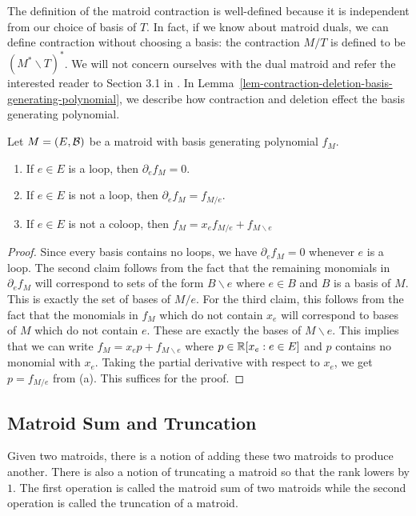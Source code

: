 \documentclass{puthesis-UG}
\begin{document}
The definition of the matroid contraction is well-defined because it is independent from our choice of basis of $T$. In fact, if we know about matroid duals, we can define contraction without choosing a basis: the contraction $M / T$ is defined to be $(M^* \backslash T)^*$. We will not concern ourselves with the dual matroid and refer the interested reader to Section 3.1 in \cite{10.5555/1197093}. In Lemma~\ref{lem-contraction-deletion-basis-generating-polynomial}, we describe how contraction and deletion effect the basis generating polynomial. 

\begin{lem} \label{lem-contraction-deletion-basis-generating-polynomial}
	Let $M = (E, \mathcal{B})$ be a matroid with basis generating polynomial $f_M$.
	\begin{enumerate}[label = (\alph*)]
		\item If $e \in E$ is a loop, then $\partial_e f_M = 0$. 
		\item If $e \in E$ is not a loop, then $\partial_e f_M = f_{M/e}$. 
		\item If $e \in E$ is not a coloop, then $f_M = x_e f_{M/e} + f_{M \backslash e}$
	\end{enumerate}
\end{lem}

\begin{proof}
	Since every basis contains no loops, we have $\partial_e f_M = 0$ whenever $e$ is a loop. The second claim follows from the fact that the remaining monomials in $\partial_e f_M$ will correspond to sets of the form $B \backslash e$ where $e \in B$ and $B$ is a basis of $M$. This is exactly the set of bases of $M / e$. For the third claim, this follows from the fact that the monomials in $f_M$ which do not contain $x_e$ will correspond to bases of $M$ which do not contain $e$. These are exactly the bases of $M \backslash e$. This implies that we can write $f_M = x_e p + f_{M \backslash e}$ where $p \in \mathbb{R}[x_e : e \in E]$ and $p$ contains no monomial with $x_e$. Taking the partial derivative with respect to $x_e$, we get $p = f_{M / e}$ from (a). This suffices for the proof. 
\end{proof}

\subsection{Matroid Sum and Truncation}

Given two matroids, there is a notion of adding these two matroids to produce another. There is also a notion of truncating a matroid so that the rank lowers by $1$. The first operation is called the matroid sum of two matroids while the second operation is called the truncation of a matroid. \\
\end{document}
